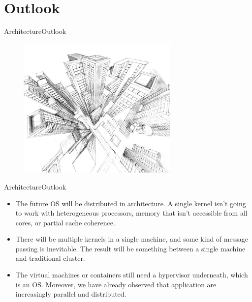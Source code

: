 \documentclass[10pt]{beamer}
\begin{document}
\section{Outlook}
\begin{frame}{Architecture}{Outlook}
  \begin{figure}[ht]
    \centering
    \includegraphics[width=0.7\textwidth, keepaspectratio=true]{images/outlook.jpg}
  \end{figure}
\end{frame}

\begin{frame}{Architecture}{Outlook}
  \begin{itemize}
    \item The future OS will be distributed in architecture. A single kernel
          isn't going to work with heterogeneous processors, memory that isn't
          accessible from all cores, or partial cache coherence. \pause
    \item There will be multiple kernels in a single machine, and some kind of
          message passing is inevitable. The result will be something between a
          single machine and traditional cluster. \pause
    \item The virtual machines or containers still need a hypervisor
          underneath, which is an OS\@. Moreover, we have already observed that
          application are increasingly parallel and distributed.
  \end{itemize}
\end{frame}

\end{document}
